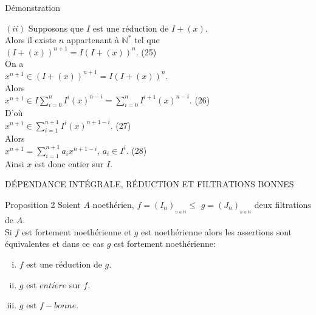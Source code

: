 \documentclass[11pt,a4paper]{beamer}
\begin{document}
	
					\begin{frame}{Démonstration}
		\begin{block}{}
				$(ii)$ Supposons que $I$ est une réduction de $I + (x)$.\\
			Alors il existe $ n $ appartenant à $ \mathbb{N^*}$ tel que \\ $(I + (x))^{n+1} = I(I + (x))^{n}$. (25)\\
			On a \\ $x^{n+1} \in (I + (x))^{n+1} = I(I + (x))^{n}$. \\Alors \\ $x^{n+1} \in I\displaystyle \sum_{i=0}^{n}{I^i (x)^{n-i}} = \displaystyle \sum_{i=0}^{n}{I^{i+1} (x)^{n-i}}$. (26)\\
			D'où \\$x^{n+1} \in \displaystyle \sum_{i=1}^{n+1}{I^i (x)^{n+1-i}}$. (27)\\ Alors \\$ x^{n+1} =  \displaystyle \sum_{i=1}^{n+1}{a_i x^{n+1-i}}$,  $a_i \in I^i$. (28)\\ Ainsi $x$ est donc entier sur $I$.
		\end{block}
	\end{frame}
	
	
	
	
	\begin{frame}{DÉPENDANCE INTÉGRALE, RÉDUCTION ET FILTRATIONS BONNES}
		\begin{block}{Proposition 2}
			Soient $A$ noethérien, $f=(I_{n})_{_{n\in \mathbb{N}}}\leq $ $g=(J_{n})_{_{n\in \mathbb{N}}}$ deux filtrations de $A.$ \\ Si $f$ est fortement noethérienne et $g$ est noethérienne alors les assertions sont équivalentes et dans ce cas $g$ est fortement noethérienne:
			\begin{enumerate}[(i)]
				\item $f$ est une réduction de $g.$
				\item $g$ est $enti\grave{e}re$ sur $f.$
				\item $g$ est $f-bonne.$
			\end{enumerate}
		\end{block}
	\end{frame}
	
\end{document}
